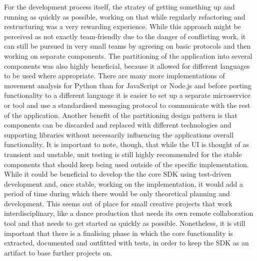 For the development process itself, the stratey of getting something up and running as quickly as possible, working on that while regularly refactoring and restructuring was a very rewarding experience.
While this approach might be perceived as not exactly team-friendly due to the danger of conflicting work, it can still be pursued in very small teams by agreeing on basic protocols and then working on separate components.
The partitioning of the application into several components was also highly beneficial, because it allowed for different languages to be used where appropriate.
There are many more implementations of movement analysis for Python than for JavaScript or Node.js and before porting functionality to a different language it is easier to set up a separate microservice or tool and use a standardised messaging protocol to communicate with the rest of the application.
Another benefit of the partitioning design pattern is that components can be discarded and replaced with different technologies and supporting libraries without necessarily influencing the application\textquotesingle s overall functionality.
It is important to note, though, that while the \ac{UI} is thought of as transient and unstable, unit testing is still highly recommended for the stable components that should keep being used outside of the specific implementation.
While it could be beneficial to develop the the core \ac{SDK} using test-driven development and, once stable, working on the implementation, it would add a period of time during which there would be only theoretical planning and development.
This seems out of place for small creative projects that work interdisciplinary, like a dance production that needs its own remote collaboration tool and that needs to get started as quickly as possible.
Nonetheless, it is still important that there is a finalising phase in which the core functionality is extracted, documented and outfitted with tests, in order to keep the \ac{SDK} as an artifact to base further projects on.
